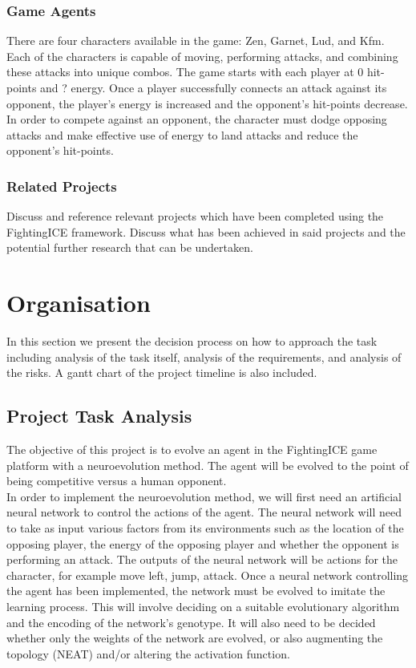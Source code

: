 \documentclass[11pt,a4paper]{article}
\begin{document}
\subsubsection{Game Agents}
There are four characters available in the game: Zen, Garnet, Lud, and Kfm. Each of the characters is capable of moving, performing attacks, and combining these attacks into unique combos. The game starts with each player at 0 hit-points and ? energy. Once a player successfully connects an attack against its opponent, the player's energy is increased and the opponent's hit-points decrease. In order to compete against an opponent, the character must dodge opposing attacks and make effective use of energy to land attacks and reduce the opponent's hit-points.\\


\subsubsection{Related Projects}
Discuss and reference relevant projects which have been completed using the FightingICE framework. Discuss what has been achieved in said projects and the potential further research that can be undertaken.

\newpage
\section{Organisation}
In this section we present the decision process on how to approach the task including analysis of the task itself, analysis of the requirements, and analysis of the risks. A gantt chart of the project timeline is also included.
\subsection{Project Task Analysis}
The objective of this project is to evolve an agent in the FightingICE game platform with a neuroevolution method. The agent will be evolved to the point of being competitive versus a human opponent. \\

In order to implement the neuroevolution method, we will first need an artificial neural network to control the actions of the agent. The neural network will need to take as input various factors from its environments such as the location of the opposing player, the energy of the opposing player and whether the opponent is performing an attack. The outputs of the neural network will be actions for the character, for example move left, jump, attack. Once a neural network controlling the agent has been implemented, the network must be evolved to imitate the learning process. This will involve deciding on a suitable evolutionary algorithm and the encoding of the network's genotype. It will also need to be decided whether only the weights of the network are evolved, or also augmenting the topology (NEAT) and/or altering the activation function.\\
\end{document}
